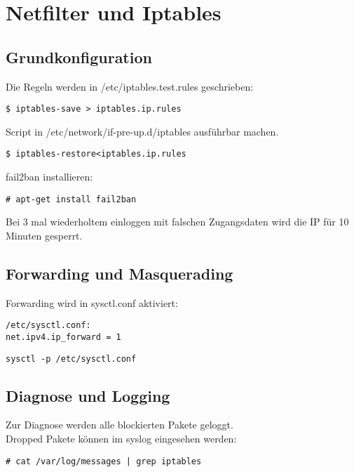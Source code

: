 \chapter{Netfilter und Iptables}
\section{Grundkonfiguration}
Die Regeln werden in /etc/iptables.test.rules geschrieben:

\begin{lstlisting}[style=Bash]
$ iptables-save > iptables.ip.rules
\end{lstlisting}
Script in /etc/network/if-pre-up.d/iptables ausführbar machen.\\
\begin{lstlisting}[style=Bash]
$ iptables-restore<iptables.ip.rules
\end{lstlisting}
fail2ban installieren:
\begin{lstlisting}[style=Bash]
# apt-get install fail2ban
\end{lstlisting}
Bei 3 mal wiederholtem einloggen mit falschen Zugangsdaten wird die IP für 10 Minuten gesperrt.
\section{Forwarding und Masquerading}
Forwarding wird in sysctl.conf aktiviert:
\begin{lstlisting}[style=Bash]
/etc/sysctl.conf:
net.ipv4.ip_forward = 1
\end{lstlisting}
\begin{lstlisting}[style=Bash]
sysctl -p /etc/sysctl.conf
\end{lstlisting}
\section{Diagnose und Logging}
Zur Diagnose werden alle blockierten Pakete geloggt.\\
Dropped Pakete können im syslog eingesehen werden:
\begin{lstlisting}[style=Bash]
# cat /var/log/messages | grep iptables
\end{lstlisting}
